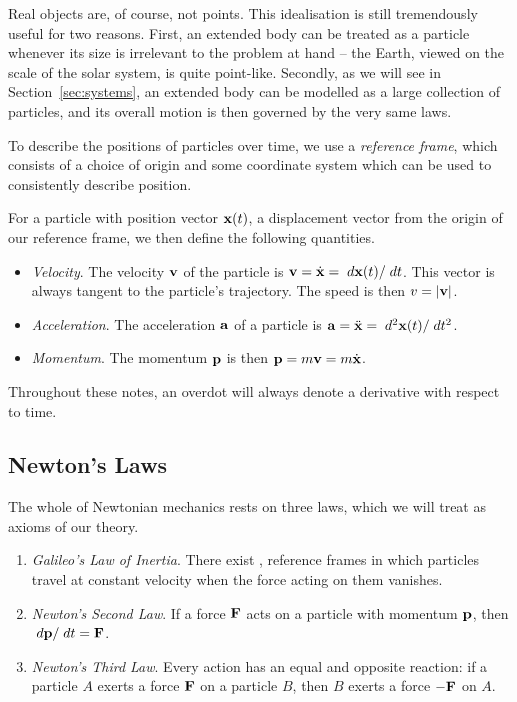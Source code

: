 \documentclass[a4paper]{scrartcl}
\begin{document}
Real objects are, of course, not points. This idealisation is still tremendously useful for two reasons. First, an extended body can be treated as a particle whenever its size is irrelevant to the problem at hand -- the Earth, viewed on the scale of the solar system, is quite point-like. Secondly, as we will see in Section~\ref{sec:systems}, an extended body can be modelled as a large collection of particles, and its overall motion is then governed by the very same laws.

To describe the positions of particles over time, we use a \emph{reference frame}, which consists of a choice of origin and some coordinate system which can be used to consistently describe position.

For a particle with position vector $\mathbf{x}(t)$, a displacement vector from the origin of our reference frame, we then define the following quantities.
\begin{itemize}
	\item \emph{Velocity}. The velocity $\mathbf{v}$ of the particle is $\mathbf{v} = \dot{\mathbf{x}} = \; d \mathbf{x}(t) / \; d t$. This vector is always tangent to the particle's trajectory. The speed is then $v = |\mathbf{v}|$.
	\item \emph{Acceleration}. The acceleration $\mathbf{a}$ of a particle is $\mathbf{a} = \ddot{\mathbf{x}} = \; d^2 \mathbf{x}(t)/\; d t^2$.
	\item \emph{Momentum}. The momentum $\mathbf{p}$ is then $\mathbf{p} = m \mathbf{v} = m \dot{\mathbf{x}}$.
\end{itemize}
Throughout these notes, an overdot will always denote a derivative with respect to time.

\subsection{Newton's Laws}

The whole of Newtonian mechanics rests on three laws, which we will treat as axioms of our theory.

\begin{law}
	\begin{enumerate}
		\item \emph{Galileo's Law of Inertia}. There exist , reference frames in which particles travel at constant velocity when the force acting on them vanishes.
		\item \emph{Newton's Second Law}. If a force $\mathbf{F}$ acts on a particle with momentum $\mathbf{p}$, then $\; d\mathbf{p}/\; d t = \mathbf{F}$.
		\item \emph{Newton's Third Law}. Every action has an equal and opposite reaction: if a particle $A$ exerts a force $\mathbf{F}$ on a particle $B$, then $B$ exerts a force $-\mathbf{F}$ on $A$.
	\end{enumerate}
\end{law}
\end{document}
